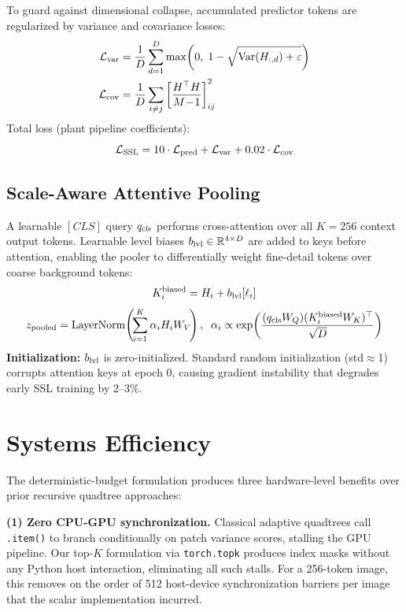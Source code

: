 \documentclass[10pt,twocolumn,letterpaper]{article}
\begin{document}
To guard against dimensional collapse, accumulated predictor tokens are regularized by variance and covariance losses:
\begin{align}
\mathcal{L}_{\rm var} &= \frac{1}{D}\sum_{d=1}^D \max\!\left(0,\; 1 - \sqrt{\operatorname{Var}(H_{:,d}) + \varepsilon}\right) \\
\mathcal{L}_{\rm cov} &= \frac{1}{D}\sum_{i \ne j} \left[\frac{H^\top H}{M\!-\!1}\right]_{ij}^2
\end{align}
Total loss (plant pipeline coefficients):
\begin{equation}
\mathcal{L}_{\rm SSL} = 10 \cdot \mathcal{L}_{\rm pred} + \mathcal{L}_{\rm var} + 0.02 \cdot \mathcal{L}_{\rm cov}
\end{equation}

\subsection{Scale-Aware Attentive Pooling}
\label{sec:pooling}

A learnable $[CLS]$ query $q_{\rm cls}$ performs cross-attention over all $K=256$ context output tokens. Learnable level biases $b_{\rm lvl} \in \mathbb{R}^{4 \times D}$ are added to keys before attention, enabling the pooler to differentially weight fine-detail tokens over coarse background tokens:
\begin{equation}
K_i^{\rm biased} = H_i + b_{\rm lvl}[\ell_i]
\end{equation}
\begin{equation}
z_{\rm pooled} = \operatorname{LayerNorm}\!\left(\!\sum_{i=1}^K \alpha_i H_i W_V\!\right),\;\;\alpha_i \propto \exp\!\left(\frac{(q_{\rm cls} W_Q)(K_i^{\rm biased} W_K)^\top}{\sqrt{D}}\right)
\end{equation}
\textbf{Initialization:} $b_{\rm lvl}$ is zero-initialized. Standard random initialization (std$\approx$1) corrupts attention keys at epoch 0, causing gradient instability that degrades early SSL training by 2–3\%.

\section{Systems Efficiency}
\label{sec:systems}

The deterministic-budget formulation produces three hardware-level benefits over prior recursive quadtree approaches:

\textbf{(1) Zero CPU-GPU synchronization.} Classical adaptive quadtrees call \texttt{.item()} to branch conditionally on patch variance scores, stalling the GPU pipeline. Our top-$K$ formulation via \texttt{torch.topk} produces index masks without any Python host interaction, eliminating all such stalls. For a 256-token image, this removes on the order of 512 host-device synchronization barriers per image that the scalar implementation incurred.
\end{document}
